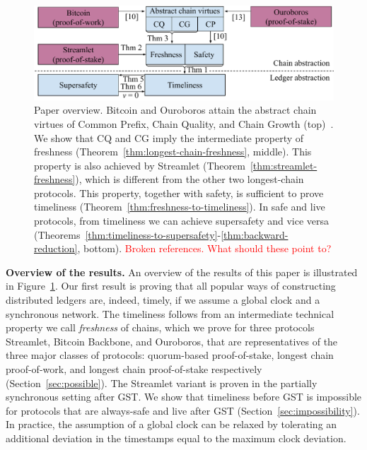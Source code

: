 \begin{figure}
  \centering
  \includegraphics[width=1.0\columnwidth,keepaspectratio]{figures/timeliness-overview.pdf}
  \caption{Paper overview. Bitcoin and Ouroboros attain the abstract chain virtues
  of Common Prefix, Chain Quality, and Chain Growth (top)~\cite{backbone,ouroboros}.
  We show that CQ and CG imply the intermediate property of freshness
  (Theorem~\ref{thm:longest-chain-freshness}, middle). This property is also achieved by Streamlet
  (Theorem~\ref{thm:streamlet-freshness}), which is different from the other two longest-chain protocols. This property, together with safety,
  is sufficient to prove timeliness
  (Theorem~\ref{thm:freshness-to-timeliness}). In safe and live protocols, from timeliness we can achieve supersafety
  and vice versa (Theorems~\ref{thm:timeliness-to-supersafety}-\ref{thm:backward-reduction}, bottom).
  \textcolor{red}{Broken references. What should these point to?}
  }
 \label{fig:overview}
\end{figure}

\noindent
\textbf{Overview of the results.}
An overview of the results of this paper is illustrated in Figure~\ref{fig:overview}.
Our first result is proving that all popular ways of constructing distributed ledgers
are, indeed, timely, if we assume a global clock and a synchronous network.
The timeliness follows from an intermediate technical property we call \emph{freshness}
of chains, which we prove for three protocols
Streamlet, Bitcoin Backbone, and Ouroboros, that are representatives
of the three major classes of protocols: quorum-based proof-of-stake, longest chain
proof-of-work, and longest chain proof-of-stake respectively (Section~\ref{sec:possible}).
The Streamlet variant is proven in the partially synchronous setting after GST.
We show that timeliness before GST is impossible for protocols that are always-safe
and live after GST (Section~\ref{sec:impossibility}).
In practice, the assumption of a global clock can be relaxed by tolerating an additional deviation in the timestamps equal to the maximum clock deviation.

